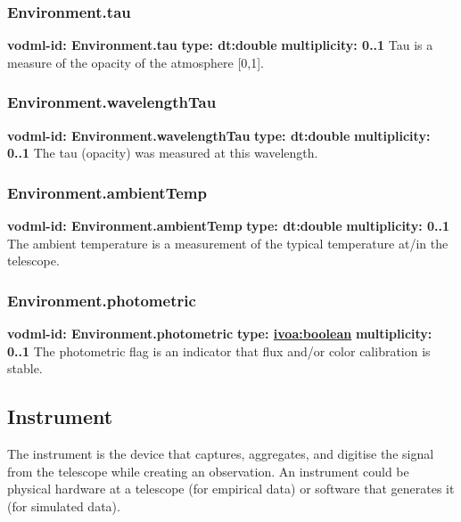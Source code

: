     \subsubsection{Environment.tau}
      \textbf{vodml-id: Environment.tau} \newline
      \textbf{type: dt:double} \newline
      \textbf{multiplicity: 0..1} \newline
      Tau is a measure of the opacity of the atmosphere [0,1].

    \subsubsection{Environment.wavelengthTau}
      \textbf{vodml-id: Environment.wavelengthTau} \newline
      \textbf{type: dt:double} \newline
      \textbf{multiplicity: 0..1} \newline
      The tau (opacity) was measured at this wavelength.

    \subsubsection{Environment.ambientTemp}
      \textbf{vodml-id: Environment.ambientTemp} \newline
      \textbf{type: dt:double} \newline
      \textbf{multiplicity: 0..1} \newline
      The ambient temperature is a measurement of the typical temperature at/in the telescope.

    \subsubsection{Environment.photometric}
      \textbf{vodml-id: Environment.photometric} \newline
      \textbf{type: \hyperref[sect:ivoa]{ivoa:boolean}} \newline
      \textbf{multiplicity: 0..1} \newline
      The photometric flag is an indicator that flux and/or color calibration is stable.

  \subsection{Instrument}
  \label{sect:Instrument}
    The instrument is the device that captures, aggregates, and digitise the signal from the telescope while creating an observation. An instrument could be physical hardware at a telescope (for empirical data) or software that generates it (for simulated data).

